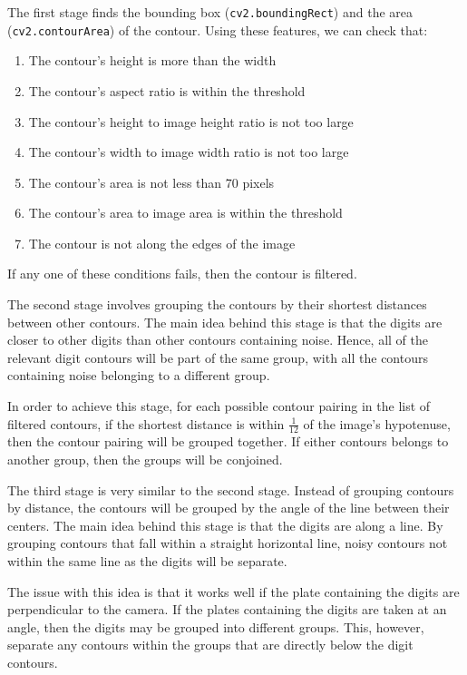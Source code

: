 \documentclass[a4paper, 10pt, titlepage]{article}
\newcommand{\code}[1]{\small\texttt{#1}\normalsize}
\begin{document}
\begin{samepage}
The first stage finds the bounding box (\code{cv2.boundingRect}) and the area
(\code{cv2.contourArea}) of the contour. Using these features, we can check
that:

\begin{enumerate}
    \item The contour's height is more than the width
    \item The contour's aspect ratio is within the threshold
    \item The contour's height to image height ratio is not too large
    \item The contour's width to image width ratio is not too large
    \item The contour's area is not less than 70 pixels
    \item The contour's area to image area is within the threshold
    \item The contour is not along the edges of the image
\end{enumerate}
\end{samepage}

If any one of these conditions fails, then the contour is filtered.

The second stage involves grouping the contours by their shortest distances
between other contours. The main idea behind this stage is that the digits are
closer to other digits than other contours containing noise. Hence, all of the
relevant digit contours will be part of the same group, with all the contours
containing noise belonging to a different group.

In order to achieve this stage, for each possible contour pairing in the list
of filtered contours, if the shortest distance is within $\frac{1}{12}$ of the
image's hypotenuse, then the contour pairing will be grouped together. If
either contours belongs to another group, then the groups will be conjoined.

The third stage is very similar to the second stage. Instead of grouping
contours by distance, the contours will be grouped by the angle of the line
between their centers. The main idea behind this stage is that the digits are
along a line. By grouping contours that fall within a straight horizontal line,
noisy contours not within the same line as the digits will be separate.

The issue with this idea is that it works well if the plate containing the
digits are perpendicular to the camera. If the plates containing the digits are
taken at an angle, then the digits may be grouped into different groups. This,
however, separate any contours within the groups that are directly below the
digit contours.
\end{document}
